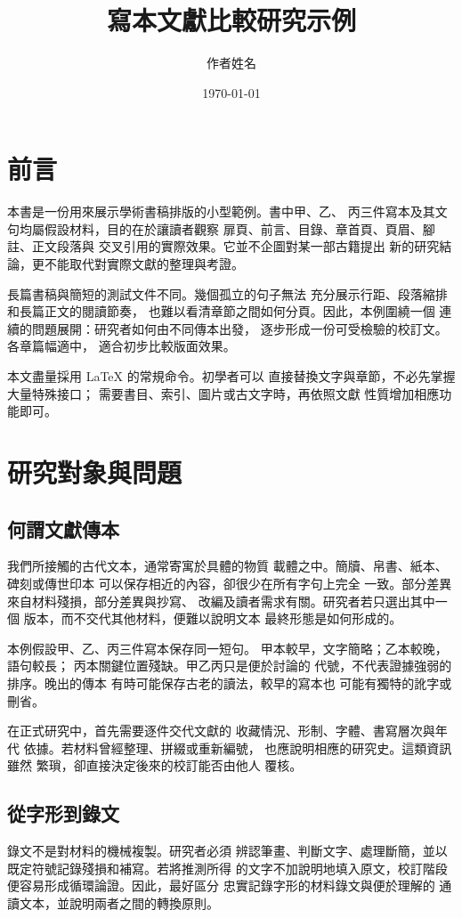 \documentclass[lang=zh]{impebook}
\title{寫本文獻比較研究示例}
\author{作者姓名}
\date{\today}
\begin{document}
\frontmatter
\maketitle
\chapter*{前言}
本書是一份用來展示學術書稿排版的小型範例。書中甲、乙、
丙三件寫本及其文句均屬假設材料，目的在於讓讀者觀察
扉頁、前言、目錄、章首頁、頁眉、腳註、正文段落與
交叉引用的實際效果。它並不企圖對某一部古籍提出
新的研究結論，更不能取代對實際文獻的整理與考證。

長篇書稿與簡短的測試文件不同。幾個孤立的句子無法
充分展示行距、段落縮排和長篇正文的閱讀節奏，
也難以看清章節之間如何分頁。因此，本例圍繞一個
連續的問題展開：研究者如何由不同傳本出發，
逐步形成一份可受檢驗的校訂文。各章篇幅適中，
適合初步比較版面效果。

本文盡量採用 \LaTeX{} 的常規命令。初學者可以
直接替換文字與章節，不必先掌握大量特殊接口；
需要書目、索引、圖片或古文字時，再依照文獻
性質增加相應功能即可。

\tableofcontents
\mainmatter

\chapter{研究對象與問題}\label{chap:problem}
\section{何謂文獻傳本}
我們所接觸的古代文本，通常寄寓於具體的物質
載體之中。簡牘、帛書、紙本、碑刻或傳世印本
可以保存相近的內容，卻很少在所有字句上完全
一致。部分差異來自材料殘損，部分差異與抄寫、
改編及讀者需求有關。研究者若只選出其中一個
版本，而不交代其他材料，便難以說明文本
最終形態是如何形成的。

本例假設甲、乙、丙三件寫本保存同一短句。
甲本較早，文字簡略；乙本較晚，語句較長；
丙本關鍵位置殘缺。甲乙丙只是便於討論的
代號，不代表證據強弱的排序。晚出的傳本
有時可能保存古老的讀法，較早的寫本也
可能有獨特的訛字或刪省。

在正式研究中，首先需要逐件交代文獻的
收藏情況、形制、字體、書寫層次與年代
依據。若材料曾經整理、拼綴或重新編號，
也應說明相應的研究史。這類資訊雖然
繁瑣，卻直接決定後來的校訂能否由他人
覆核。

\section{從字形到錄文}
錄文不是對材料的機械複製。研究者必須
辨認筆畫、判斷文字、處理斷簡，並以
既定符號記錄殘損和補寫。若將推測所得
的文字不加說明地填入原文，校訂階段
便容易形成循環論證。因此，最好區分
忠實記錄字形的材料錄文與便於理解的
通讀文本，並說明兩者之間的轉換原則。
\end{document}
